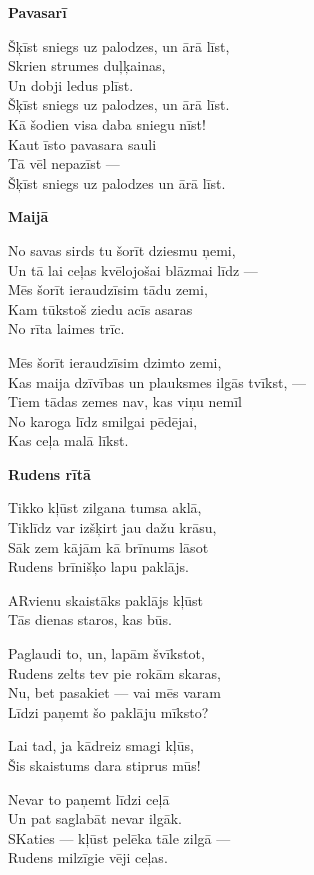 \documentclass[11pt]{article}
\begin{document}
{\newpage

{\bf Pavasarī}

Šķīst sniegs uz palodzes, un ārā līst,\\
Skrien strumes duļķainas,\\
Un dobji ledus plīst.\\
Šķīst sniegs uz palodzes, un ārā līst.\\
Kā šodien visa daba sniegu nīst!\\
Kaut īsto pavasara sauli\\
Tā vēl nepazīst ---\\
Šķīst sniegs uz palodzes un ārā līst.


\newpage

{\bf Maijā}

No savas sirds tu šorīt dziesmu ņemi,\\
Un tā lai ceļas kvēlojošai blāzmai līdz ---\\
Mēs šorīt ieraudzīsim tādu zemi,\\
Kam tūkstoš ziedu acīs asaras\\
No rīta laimes trīc.

Mēs šorīt ieraudzīsim dzimto zemi,\\
Kas maija dzīvības un plauksmes ilgās tvīkst, ---\\
Tiem tādas zemes nav, kas viņu nemīl\\
No karoga līdz smilgai pēdējai,\\
Kas ceļa malā līkst.


\newpage
{\bf Rudens rītā}

Tikko kļūst zilgana tumsa aklā,\\
Tiklīdz var izšķirt jau dažu krāsu,\\
Sāk zem kājām kā brīnums lāsot\\
Rudens brīnišķo lapu paklājs.

ARvienu skaistāks paklājs kļūst\\
Tās dienas staros, kas būs.

Paglaudi to, un, lapām švīkstot,\\
Rudens zelts tev pie rokām skaras,\\
Nu, bet pasakiet --- vai mēs varam\\
Līdzi paņemt šo paklāju mīksto?

Lai tad, ja kādreiz smagi kļūs,\\
Šis skaistums dara stiprus mūs!

Nevar to paņemt līdzi ceļā\\
Un pat saglabāt nevar ilgāk.\\
SKaties --- kļūst pelēka tāle zilgā ---\\
Rudens milzīgie vēji ceļas.

}
\end{document}
